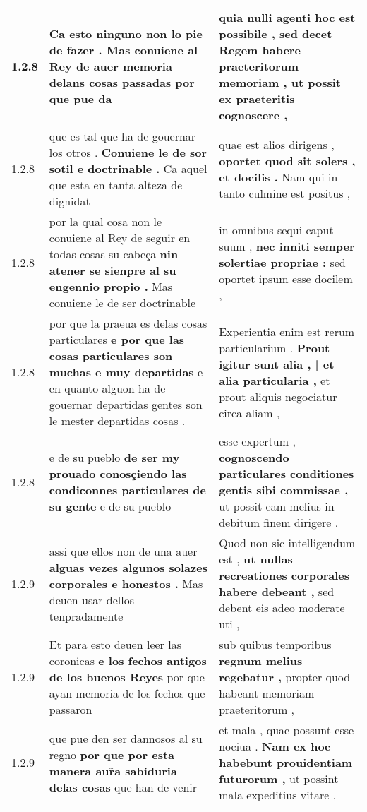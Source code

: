 \begin{tabular}{|p{1cm}|p{6.5cm}|p{6.5cm}|}
1.2.8 & Ca esto ninguno non lo pie de fazer . \textbf{ Mas conuiene al Rey de auer memoria delans cosas passadas } por que pue da & quia nulli agenti hoc est possibile , \textbf{ sed decet Regem habere praeteritorum memoriam , } ut possit ex praeteritis cognoscere , \\\hline
1.2.8 & que es tal que ha de gouernar los otros . \textbf{ Conuiene le de sor sotil e doctrinable . } Ca aquel que esta en tanta alteza de dignidat & quae est alios dirigens , \textbf{ oportet quod sit solers , et docilis . } Nam qui in tanto culmine est positus , \\\hline
1.2.8 & por la qual cosa non le conuiene al Rey de seguir en todas cosas su cabeça \textbf{ nin atener se sienpre al su engennio propio . } Mas conuiene le de ser doctrinable & in omnibus sequi caput suum , \textbf{ nec inniti semper solertiae propriae : } sed oportet ipsum esse docilem , \\\hline
1.2.8 & por que la praeua es delas cosas particulares \textbf{ e por que las cosas particulares son muchas e muy departidas } e en quanto alguon ha de gouernar departidas gentes son le mester departidas cosas . & Experientia enim est rerum particularium . \textbf{ Prout igitur sunt alia , | et alia particularia , } et prout aliquis negociatur circa aliam , \\\hline
1.2.8 & e de su pueblo \textbf{ de ser my prouado conosçiendo las condiconnes particulares de su gente } e de su pueblo & esse expertum , \textbf{ cognoscendo particulares conditiones gentis sibi commissae , } ut possit eam melius in debitum finem dirigere . \\\hline
1.2.9 & assi que ellos non de una auer \textbf{ alguas vezes algunos solazes corporales e honestos . } Mas deuen usar dellos tenpradamente & Quod non sic intelligendum est , \textbf{ ut nullas recreationes corporales habere debeant , } sed debent eis adeo moderate uti , \\\hline
1.2.9 & Et para esto deuen leer las coronicas \textbf{ e los fechos antigos de los buenos Reyes } por que ayan memoria de los fechos que passaron & sub quibus temporibus \textbf{ regnum melius regebatur , } propter quod habeant memoriam praeteritorum , \\\hline
1.2.9 & que pue den ser dannosos al su regno \textbf{ por que por esta manera aur̃a sabiduria delas cosas } que han de venir & et mala , quae possunt esse nociua . \textbf{ Nam ex hoc habebunt prouidentiam futurorum , } ut possint mala expeditius vitare , \\\hline

\end{tabular}
